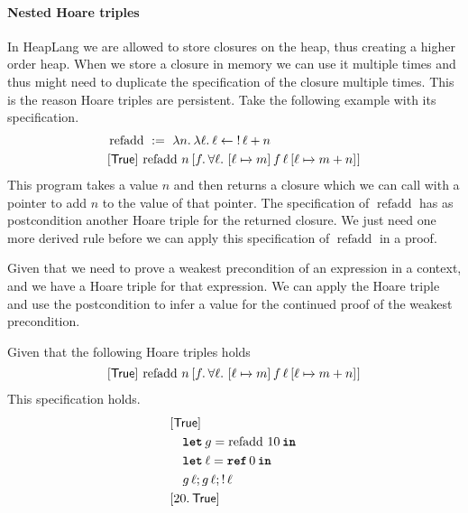 \documentclass[thesis.tex]{subfiles}
\begin{document}
\paragraph*{Nested Hoare triples}
In HeapLang we are allowed to store closures on the heap, thus creating a higher order heap. When we store a closure in memory we can use it multiple times and thus might need to duplicate the specification of the closure multiple times. This is the reason Hoare triples are persistent. Take the following example with its specification.
\begin{align*}
   & \operatorname{refadd}\ :=\ \Lam n. \Lam \loc. \loc \gets \deref \loc + n                                                 \\
   & \hoare{\TRUE}{\operatorname{refadd}\, n}{\Ret f. {\forall \loc.\ \hoare{\loc \fmapsto m}{f\, \loc}{\loc\fmapsto m + n}}}
\end{align*}
This program takes a value $n$ and then returns a closure which we can call with a pointer to add $n$ to the value of that pointer. The specification of $\operatorname{refadd}$ has as postcondition another Hoare triple for the returned closure. We just need one more derived rule before we can apply this specification of $\operatorname{refadd}$ in a proof.
Given that we need to prove a weakest precondition of an expression in a context, and we have a Hoare triple for that expression. We can apply the Hoare triple and use the postcondition to infer a value for the continued proof of the weakest precondition.
\begin{lemma}
  Given that the following Hoare triples holds $$\hoare{\TRUE}{\operatorname{refadd}\, n}{\Ret f. {\forall \loc.\ \hoare{\loc \fmapsto m}{f\, \loc}{\loc\fmapsto m + n}}}$$
  This specification holds.
  \[
    \begin{aligned}
       & \rightbracket{\TRUE}                         \\
       & \quad \Let g = \operatorname{refadd}\, 10 in \\
       & \quad \Let \loc = \Alloc 0 in                \\
       & \quad g\, \loc; g\, \loc; \deref \loc        \\
       & \rightbracket{\Ret 20. \TRUE}
    \end{aligned}
  \]
\end{lemma}
\end{document}
